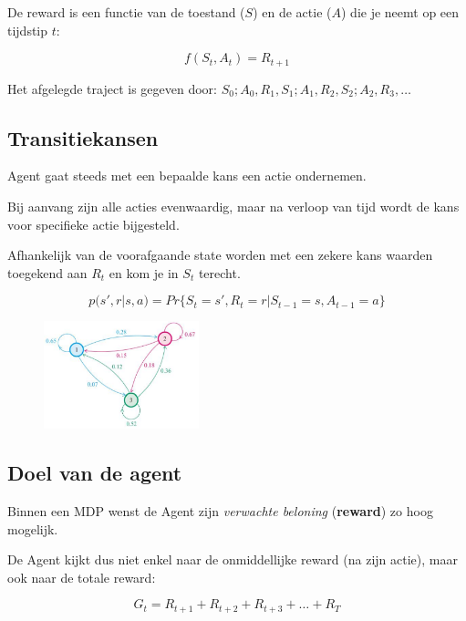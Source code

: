 \documentclass{article}
\begin{document}
De reward is een functie van de toestand ($S$) en de actie ($A$) die je neemt op een tijdstip $t$:

\begin{equation}
    f(S_t, A_t) = R_{t + 1}
\end{equation}

Het afgelegde traject is gegeven door: $S_0; A_0, R_1, S_1; A_1, R_2, S_2; A_2, R_3, \dots$

\subsection{Transitiekansen}

Agent gaat steeds met een bepaalde kans een actie ondernemen.

Bij aanvang zijn alle acties evenwaardig, maar na verloop van tijd wordt
de kans voor specifieke actie bijgesteld.

Afhankelijk van de voorafgaande state worden met een zekere kans waarden toegekend aan $R_t$
en kom je in $S_t$ terecht.

\begin{equation}
    p(s', r | s,a) = Pr\{S_t = s', R_t = r | S_{t-1} = s, A_{t-1} = a\}
\end{equation}

\begin{figure}[H]
    \centering
    \includegraphics[width=0.4\textwidth]{transitiekansen.png}
\end{figure}

\subsection{Doel van de agent}

Binnen een MDP wenst de Agent zijn \textit{verwachte beloning} (\textbf{reward}) zo
hoog mogelijk.

De Agent kijkt dus niet enkel naar de onmiddellijke reward (na zijn actie),
maar ook naar de totale reward:

\begin{equation}
    G_t = R_{t+1} + R_{t+2} + R_{t+3} + \dots + R_{T}
\end{equation}
\end{document}
